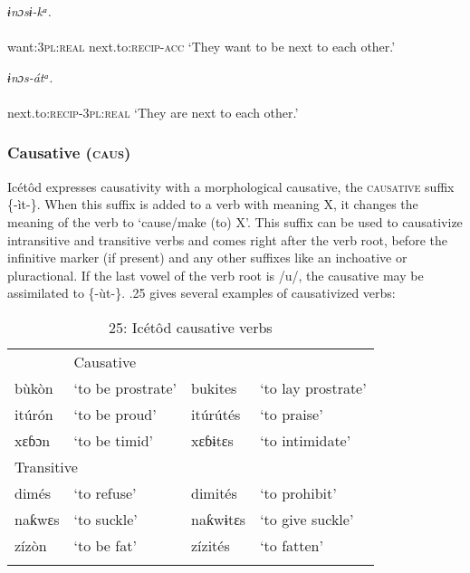 \ea\label{ex:}
\textit{ɨnɔsɨ}\textit{{}-kᵃ.} \\
    \\
want:\textsc{3pl:real}   next.to:\textsc{recip-acc}
\glt ‘They want to be next to each other.’ 
\z




\ea\label{ex:}
\textit{ɨnɔs}\textit{{}-átᵃ.} \\
    \\
next.to:\textsc{recip-3pl:real}
\glt ‘They are next to each other.’ 
\z




\subsubsection{Causative (\textsc{caus})}

Icétôd expresses causativity with a morphological causative, the \textsc{causative} suffix \{-ìt-\}. When this suffix is added to a verb with meaning X, it changes the meaning of the verb to ‘cause/make (to) X’. This suffix can be used to causativize intransitive and transitive verbs and comes right after the verb root, before the infinitive marker (if present) and any other suffixes like an inchoative or pluractional. If the last vowel of the verb root is /u/, the causative may be assimilated to \{-ùt-\}. .25 gives several examples of causativized verbs:


\begin{table}
\caption{25: Icétôd causative verbs}
\label{tab:8}


\begin{tabularx}{\textwidth}{XXXX}
\lsptoprule

\multicolumn{2}{X}{Intransitive} & \multicolumn{2}{X}{Causative}\\
bùkòn & ‘to be prostrate’ & bukites & ‘to lay prostrate’\\
itúrón & ‘to be proud’ & itúrútés & ‘to praise’\\
xɛɓɔn & ‘to be timid’ & xɛɓɨtɛs & ‘to intimidate’\\
\multicolumn{2}{X}{Transitive} &  & \\
dimés & ‘to refuse’ & dimités & ‘to prohibit’\\
naƙwɛs & ‘to suckle’ & naƙwɨtɛs & ‘to give suckle’\\
zízòn & ‘to be fat’ & zízités & ‘to fatten’\\
\lspbottomrule
\end{tabularx}
\end{table}



